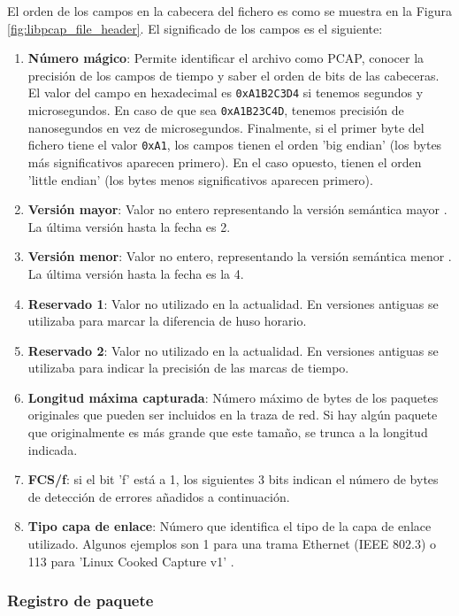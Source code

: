 El orden de los campos en la cabecera del fichero es como se muestra en la Figura \ref{fig:libpcap_file_header}. El significado de los campos es el siguiente:

\begin{enumerate}
    \item \textbf{Número mágico}: Permite identificar el archivo como PCAP, conocer la precisión de los campos de tiempo y saber el orden de bits de las cabeceras. El valor del campo en hexadecimal es \texttt{0xA1B2C3D4} si tenemos segundos y microsegundos. En caso de que sea \texttt{0xA1B23C4D}, tenemos precisión de nanosegundos en vez de microsegundos. Finalmente, si el primer byte del fichero tiene el valor \texttt{0xA1}, los campos tienen el orden 'big endian' (los bytes más significativos aparecen primero). En el caso opuesto, tienen el orden 'little endian' (los bytes menos significativos aparecen primero).
    \item \textbf{Versión mayor}: Valor no entero representando la versión semántica mayor \cite{preston2013semantic}. La última versión hasta la fecha es 2.
    \item \textbf{Versión menor}: Valor no entero, representando la versión semántica menor \cite{preston2013semantic}. La última versión hasta la fecha es la 4.
    \item \textbf{Reservado 1}: Valor no utilizado en la actualidad. En versiones antiguas se utilizaba para marcar la diferencia de huso horario.
    \item \textbf{Reservado 2}: Valor no utilizado en la actualidad. En versiones antiguas se utilizaba para indicar la precisión de las marcas de tiempo.
    \item \textbf{Longitud máxima capturada}: Número máximo de bytes de los paquetes originales que pueden ser incluidos en la traza de red. Si hay algún paquete que originalmente es más grande que este tamaño, se trunca a la longitud indicada.
    \item \textbf{FCS/f}: si el bit 'f' está a 1, los siguientes 3 bits indican el número de bytes de detección de errores añadidos a continuación. 
    \item \textbf{Tipo capa de enlace}: Número que identifica el tipo de la capa de enlace utilizado. Algunos ejemplos son 1 para una trama Ethernet (IEEE 802.3) o 113 para 'Linux Cooked Capture v1' \cite{linktypetcpdump}.
\end{enumerate}

\subsubsection{Registro de paquete}

